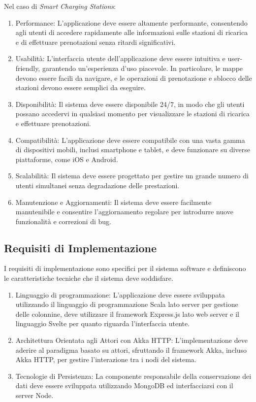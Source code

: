 Nel caso di \textit{Smart Charging Stations}:

\begin{enumerate}[label=\arabic*.]
    \item Performance: L'applicazione deve essere altamente performante, consentendo agli utenti di accedere rapidamente alle informazioni sulle stazioni di ricarica e di effettuare prenotazioni senza ritardi significativi.

    \item Usabilità: L'interfaccia utente dell'applicazione deve essere intuitiva e user-friendly, garantendo un'esperienza d'uso piacevole. In particolare, le mappe devono essere facili da navigare, e le operazioni di prenotazione e sblocco delle stazioni devono essere semplici da eseguire.

    \item Disponibilità: Il sistema deve essere disponibile 24/7, in modo che gli utenti possano accedervi in qualsiasi momento per visualizzare le stazioni di ricarica e effettuare prenotazioni.

    \item Compatibilità: L'applicazione deve essere compatibile con una vasta gamma di dispositivi mobili, inclusi smartphone e tablet, e deve funzionare su diverse piattaforme, come iOS e Android.

    \item Scalabilità: Il sistema deve essere progettato per gestire un grande numero di utenti simultanei senza degradazione delle prestazioni.

    \item Manutenzione e Aggiornamenti: Il sistema deve essere facilmente manutenibile e consentire l'aggiornamento regolare per introdurre nuove funzionalità e correzioni di bug.
\end{enumerate}

\subsection{Requisiti di Implementazione}
I requisiti di implementazione sono specifici per il sistema software e definiscono le caratteristiche tecniche che il sistema deve soddisfare.

\begin{enumerate}[label=\arabic*.]
    \item Linguaggio di programmazione: L'applicazione deve essere sviluppata utilizzando il linguaggio di programmazione Scala lato server per gestione delle colonnine, deve utilizzare il framework Express.js lato web server e il linguaggio Svelte per quanto riguarda l'interfaccia utente.
    \item Architettura Orientata agli Attori con Akka HTTP: L'implementazione deve aderire al paradigma basato su attori, sfruttando il framework Akka, incluso Akka HTTP, per gestire l'interazione tra i nodi del sistema.
    \item Tecnologie di Persistenza: La componente responsabile della conservazione dei dati deve essere sviluppata utilizzando MongoDB ed interfacciarsi con il server Node.
\end{enumerate}




